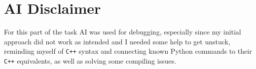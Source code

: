 \documentclass[../main.tex]{subfiles}
\begin{document}
\section{AI Disclaimer}

For this part of the task AI was used for debugging, especially since my initial approach did not work as intended and I needed some help to get unstuck, reminding myself of \verb|C++| syntax and connecting known Python commands to their \verb|C++| equivalents, as well as solving some compiling issues. 
\end{document}
